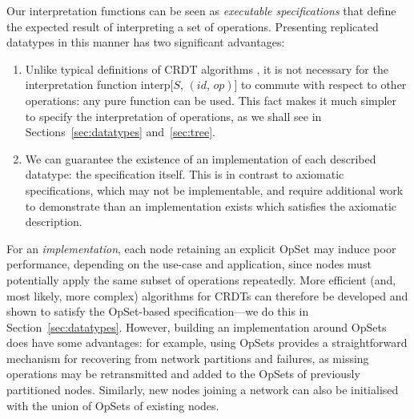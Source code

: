 Our interpretation functions can be seen as \emph{executable specifications} that define the expected result of interpreting a set of operations.
Presenting replicated datatypes in this manner has two significant advantages:
\begin{enumerate}
\item
Unlike typical definitions of CRDT algorithms \cite{Shapiro:2011wy,Shapiro:2011un}, it is not necessary for the interpretation function $\mathrm{interp}\big[S,\, (\mathit{id},\, \mathit{op})\big]$ to commute with respect to other operations: any pure function can be used.
This fact makes it much simpler to specify the interpretation of operations, as we shall see in Sections~\ref{sec:datatypes} and~\ref{sec:tree}.
\item
We can guarantee the existence of an implementation of each described datatype: the specification itself.
This is in contrast to axiomatic specifications, which may not be implementable, and require additional work to demonstrate than an implementation exists which satisfies the axiomatic description.
\end{enumerate}

For an \emph{implementation}, each node retaining an explicit OpSet may induce poor performance, depending on the use-case and application, since nodes must potentially apply the same subset of operations repeatedly.
More efficient (and, most likely, more complex) algorithms for CRDTs can therefore be developed and shown to satisfy the OpSet-based specification---we do this in Section~\ref{sec:datatypes}.
However, building an implementation around OpSets does have some advantages: for example, using OpSets provides a straightforward mechanism for recovering from network partitions and failures, as missing operations may be retransmitted and added to the OpSets of previously partitioned nodes.
Similarly, new nodes joining a network can also be initialised with the union of OpSets of existing nodes.
